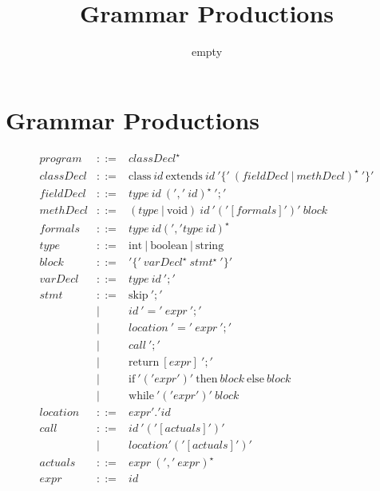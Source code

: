 \documentclass{article}
\title{Grammar Productions}
\author{empty}
\begin{document}
\maketitle %

%	

\section{Grammar Productions}
$$
\begin{array}{rcl}
 program & ::= & classDecl ^{\star} \\
 classDecl & ::= & \textrm{class} ~id~ \textrm{extends} ~id~ '\{'~( fieldDecl ~|~  methDecl)^{\star} ~'\}'  \\
 fieldDecl & ::= & type~id ~(',' ~id)^{\star} ~';' \\
 methDecl & ::= & (type~|~\textrm{void})~id~ '('[formals]')'~ block \\
 formals & ::= & type~id (',' type~id)^{\star} \\
 type & ::= & \textrm{int}~|~\textrm{boolean}~|~\textrm{string} \\
 block & ::= & '\{'~varDecl^{\star} ~stmt^{\star}~'\}' \\
 varDecl & ::= & type~id ~';' \\
 stmt & ::= & \textrm{skip} ~';'\\
 & | & id ~'='~ expr ~';'\\
 & | & location ~'='~ expr ~';'\\
 & | & call ~';'\\
 & | & \textrm{return} ~[expr] ~';'\\
 & | & \textrm{if} ~'('expr')' ~\textrm{then} ~block ~\textrm{else} ~block \\
 & | & \textrm{while} ~'('expr')' ~block\\
 location & ::= & expr'.'id\\
 call & ::= & id~'('[actuals]')'\\
 & | & location'('[actuals]')' \\
 actuals & ::= & expr ~(','~expr)^{\star}\\
 expr & ::= & id \\

\end{array}$$
\end{document}
